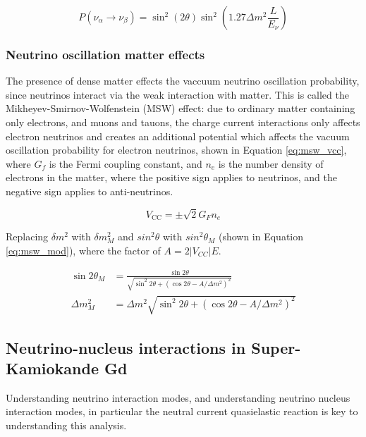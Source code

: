 \begin{equation}
P\left(\nu_{\alpha} \rightarrow \nu_{\beta}\right)=\sin ^{2}(2 \theta) \sin ^{2}\left(1.27 \Delta m^{2} \frac{L}{E_{\nu}}\right)
\label{eq:two_flavour_osc_prob}
\end{equation}

\subsubsection{Neutrino oscillation matter effects}

The presence of dense matter effects the vaccuum neutrino oscillation probability, since neutrinos interact via the weak interaction with matter. This is called the Mikheyev-Smirnov-Wolfenstein (MSW) effect: due to ordinary matter containing only electrons, and muons and tauons, the charge current interactions only affects electron neutrinos and creates an additional potential which affects the vacuum oscillation probability for electron neutrinos, shown in Equation \ref{eq:msw_vcc}, where $G_{f}$ is the Fermi coupling constant, and $n_{e}$ is the number density of electrons in the matter, where the positive sign applies to neutrinos, and the negative sign applies to anti-neutrinos. 

\begin{equation}
    V_{\mathrm{CC}}=\pm \sqrt{2} G_{F} n_{e}
\label{eq:msw_vcc}
\end{equation}

Replacing $\delta m^{2}$ with $\delta m^{2}_{M}$ and $sin^{2}\theta$ with $sin^{2}\theta_{M}$ (shown in Equation \ref{eq:msw_mod}), where the factor of $A = 2|V_{CC}|E$.

$$
\begin{aligned}
\sin 2 \theta_{M} &=\frac{\sin 2 \theta}{\sqrt{\sin ^{2} 2 \theta+\left(\cos 2 \theta-A / \Delta m^{2}\right)^{2}}} \\
\Delta m_{M}^{2} &=\Delta m^{2} \sqrt{\sin ^{2} 2 \theta+\left(\cos 2 \theta-A / \Delta m^{2}\right)^{2}}
\end{aligned}
\label{eq:msw_mod}
$$





\subsection{Neutrino-nucleus interactions in Super-Kamiokande Gd}
Understanding neutrino interaction modes, and understanding neutrino nucleus interaction modes, in particular the neutral current quasielastic reaction is key to understanding this analysis. 

